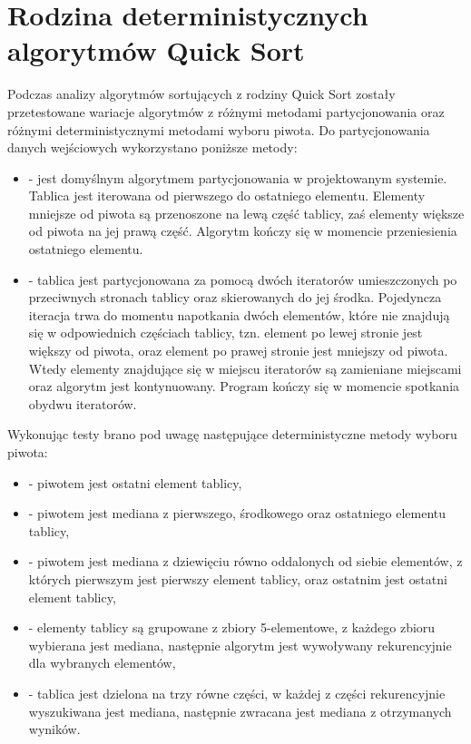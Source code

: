 \section{Rodzina deterministycznych algorytmów Quick Sort}
Podczas analizy algorytmów sortujących z rodziny Quick Sort zostały przetestowane wariacje algorytmów z różnymi metodami partycjonowania oraz różnymi deterministycznymi metodami wyboru piwota. Do partycjonowania danych wejściowych wykorzystano poniższe metody:

\begin{itemize}
	\setlength\itemsep{0em}
	\item {} - jest domyślnym algorytmem partycjonowania w projektowanym systemie. Tablica jest iterowana od pierwszego do ostatniego elementu. Elementy mniejsze od piwota są przenoszone na lewą część tablicy, zaś elementy większe od piwota na jej prawą część. Algorytm kończy się w momencie przeniesienia ostatniego elementu.
	\item {} - tablica jest partycjonowana za pomocą dwóch iteratorów umieszczonych po przeciwnych stronach tablicy oraz skierowanych do jej środka. Pojedyncza iteracja trwa do momentu napotkania dwóch elementów, które nie znajdują się w odpowiednich częściach tablicy, tzn. element po lewej stronie jest większy od piwota, oraz element po prawej stronie jest mniejszy od piwota. Wtedy elementy znajdujące się w miejscu iteratorów są zamieniane miejscami oraz algorytm jest kontynuowany. Program kończy się w momencie spotkania obydwu iteratorów.
\end{itemize}

Wykonując testy brano pod uwagę następujące deterministyczne metody wyboru piwota:
\begin{itemize}
	\setlength\itemsep{0em}
	\item {} - piwotem jest ostatni element tablicy,
	\item {} - piwotem jest mediana z pierwszego, środkowego oraz ostatniego elementu tablicy,
	\item {} - piwotem jest mediana z dziewięciu równo oddalonych od siebie elementów, z których pierwszym jest pierwszy element tablicy, oraz ostatnim jest ostatni element tablicy,
	\item {} - elementy tablicy są grupowane z zbiory 5-elementowe, z każdego zbioru wybierana jest mediana, następnie algorytm jest wywoływany rekurencyjnie dla wybranych elementów,
	\item {} - tablica jest dzielona na trzy równe części, w każdej z części rekurencyjnie wyszukiwana jest mediana, następnie zwracana jest mediana z otrzymanych wyników.\\
\end{itemize}

